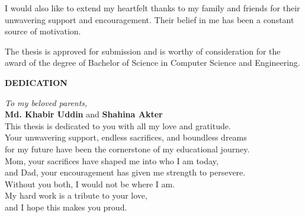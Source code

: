 \vspace{1cm}

I would also like to extend my heartfelt thanks to my family and friends for their unwavering support and encouragement. Their belief in me has been a constant source of motivation.

\vspace{1cm}

The thesis is approved for submission and is worthy of consideration for the award of the degree of Bachelor of Science in Computer Science and Engineering.




\newpage
\thispagestyle{empty}
\vspace*{4cm}

\begin{center}
    {\Large\bfseries DEDICATION}
\end{center}

\vspace{2cm}

\begin{center}
    \textit{To my beloved parents,}\\[0.5cm]
    \textbf{Md. Khabir Uddin} and \textbf{Shahina Akter}\\[1cm]
    
    This thesis is dedicated to you with all my love and gratitude.\\[0.5cm]
    
    Your unwavering support, endless sacrifices, and boundless dreams\\
    for my future have been the cornerstone of my educational journey.\\[0.8cm]
    
    Mom, your sacrifices have shaped me into who I am today,\\
    and Dad, your encouragement has given me strength to persevere.\\[0.8cm]
    
    Without you both, I would not be where I am.\\[0.5cm]
    
    My hard work is a tribute to your love,\\
    and I hope this makes you proud.
\end{center}    

\newpage
